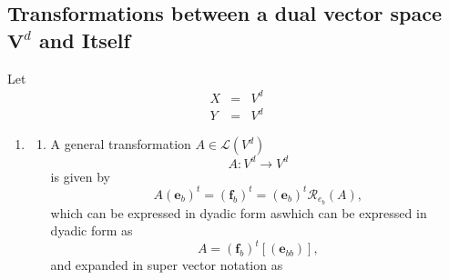 \documentclass[aps,preprint]{revtex4}
\begin{document}
\subsection{Transformations between a dual vector space $\boldsymbol{V}^{d}$
and Itself}

Let 
\begin{eqnarray}
X &=&V^{d} \\
Y &=&V^{d}
\end{eqnarray}

\begin{enumerate}
\item 
\begin{enumerate}
\item A general transformation $A\in \mathcal{L}\left( V^{d}\right) $ 
\begin{equation}
A:V^{d}\rightarrow V^{d}
\end{equation}%
is given by 
\begin{equation}
A\left( \boldsymbol{e}_{b}\right) ^{t}=\left( \boldsymbol{f}_{b}\right)
^{t}=\left( \boldsymbol{e}_{b}\right) ^{t}\mathcal{R}_{e_{b}}\left( A\right)
,
\end{equation}%
which can be expressed in dyadic form aswhich can be expressed in dyadic
form as 
\begin{equation}
A=\left( \boldsymbol{f}_{b}\right) ^{t}\left[ \left( \boldsymbol{e}%
_{bb}\right) \right] ,
\end{equation}%
and expanded in super vector notation as


\end{enumerate}
\end{enumerate}
\end{document}
